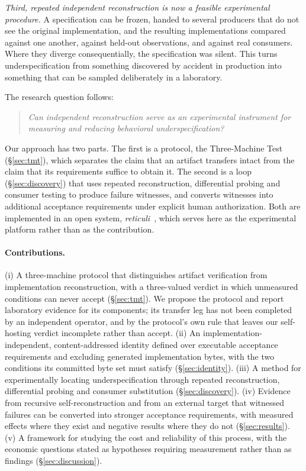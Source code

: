 \documentclass[10pt,twocolumn]{article}
\begin{document}
\emph{Third, repeated independent reconstruction is now a feasible
experimental procedure.} A specification can be frozen, handed to
several producers that do not see the original implementation, and the
resulting implementations compared against one another, against held-out
observations, and against real consumers. Where they diverge
consequentially, the specification was silent. This turns
underspecification from something discovered by accident in production
into something that can be sampled deliberately in a laboratory.

The research question follows:

\begin{quote}
\emph{Can independent reconstruction serve as an experimental instrument
for measuring and reducing behavioral underspecification?}
\end{quote}

Our approach has two parts. The first is a protocol, the Three-Machine
Test (\S\ref{sec:tmt}), which separates the claim that an artifact
transfers intact from the claim that its requirements suffice to obtain
it. The
second is a loop (\S\ref{sec:discovery}) that uses repeated
reconstruction, differential probing and consumer testing to produce
failure witnesses, and converts witnesses into additional acceptance
requirements under explicit human authorization. Both are implemented in
an open system, \emph{reticuli}~\cite{reticuli}, which serves here as the
experimental platform rather than as the contribution.

\paragraph{Contributions.}
(i) A three-machine protocol that distinguishes artifact verification
from implementation reconstruction, with a three-valued verdict in which
unmeasured conditions can never accept (\S\ref{sec:tmt}). We propose the
protocol and report laboratory evidence for its components; its transfer
leg has not been completed by an independent operator, and by the
protocol's own rule that leaves our self-hosting verdict
\textsf{incomplete} rather than \textsf{accept}.
(ii) An implementation-independent, content-addressed identity defined
over executable acceptance requirements and excluding generated
implementation bytes, with the two conditions its committed byte set must
satisfy (\S\ref{sec:identity}).
(iii) A method for experimentally locating underspecification through
repeated reconstruction, differential probing and consumer substitution
(\S\ref{sec:discovery}).
(iv) Evidence from recursive self-reconstruction and from an external
target that witnessed failures can be converted into stronger acceptance
requirements, with measured effects where they exist and negative results
where they do not (\S\ref{sec:results}).
(v) A framework for studying the cost and reliability of this process,
with the economic questions stated as hypotheses requiring measurement
rather than as findings (\S\ref{sec:discussion}).
\end{document}
